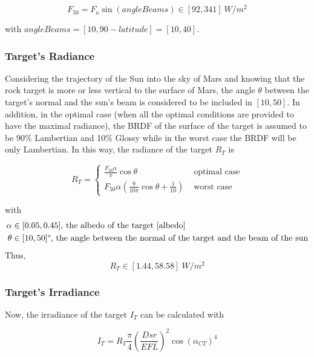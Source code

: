 \begin{equation}
F_{50} = F_a\sin(angleBeams) \in [92, 341] \ W/m^2
\end{equation}

with $angleBeams = [10, 90-latitude] = [10, 40]$\textdegree.

\subsubsection{Target's Radiance}
Considering the trajectory of the Sun into the sky of Mars and knowing that the rock target is more or less vertical to the surface of Mars, the angle $\theta$ between the target's normal and the sun's beam is considered to be included in $[10, 50]$\textdegree. In addition, in the optimal case (when all the optimal conditions are provided to have the maximal radiance), the BRDF of the surface of the target is assumed to be 90\% Lambertian and 10\% Glossy while in the worst case the BRDF will be only Lambertian. In this way, the radiance of the target $R_T$ is

\begin{equation}
\label{eq:Radiance Target}
R_T = \left\{
	\begin{array}{ll}
		\frac{F_{50}\alpha}{\pi}\cos \theta & \mbox{ optimal case} \\
		F_{50}\alpha(\frac{9}{10\pi}\cos\theta + \frac{1}{10}) & \mbox{ worst case}
	\end{array}
\right.
\end{equation}

with 
\begin{align*}
	\alpha & \in [0.05, 0.45]\mbox{, the albedo of the target \ref{albedo}} \\
	\theta & \in [10, 50]\mbox{\textdegree, the angle between the normal of the target and the beam of the sun}
\end{align*}
Thus, 
\begin{equation}
\label{eq:Radiance Target Range}
R_T \in [1.44, 58.58] \ W/m^2
\end{equation}





\subsubsection{Target's Irradiance}
\label{Target's Irradiance}
Now, the irradiance of the target $I_T$ can be calculated with

\begin{equation}
\label{eq:Irradiance Target}
I_T = R_T\frac{\pi}{4}\left(\frac{Dsr}{EFL}\right)^2\cos (\alpha_{CT})^4
\end{equation}

